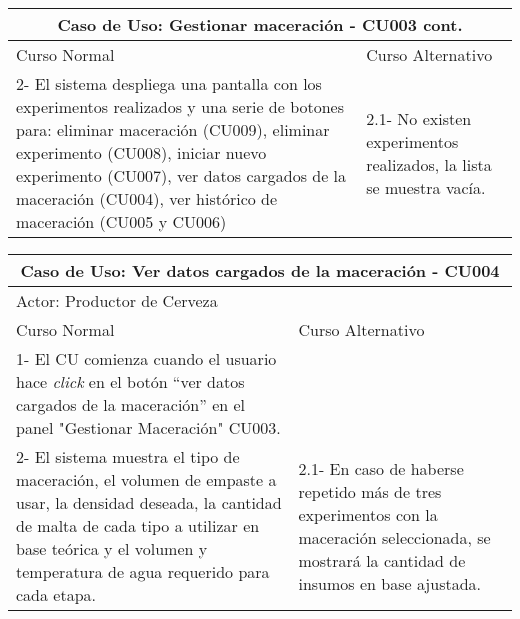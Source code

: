     \begin{minipage}{0.95\textwidth}
    \begin{center}
    \begin{tabularx}{\textwidth}{ | X | X |}
        \hline
        \multicolumn{2}{|c|}{\textbf{Caso de Uso: Gestionar maceración - CU003 cont.}} \\
        \hline
        Curso Normal & Curso Alternativo \\
        \hline    
        2- El sistema despliega una pantalla con los experimentos realizados y una serie de botones para: eliminar maceración (CU009), eliminar experimento (CU008), iniciar nuevo experimento (CU007), ver datos cargados de la maceración (CU004), ver histórico de maceración (CU005 y CU006) & 2.1- No existen experimentos realizados, la lista se muestra vacía.
        \\
        \hline
    \end{tabularx}
    \label{CU003b}
    \end{center}

    \begin{center}
    \begin{tabularx}{\textwidth}{ | X | X |}
        \hline
        \multicolumn{2}{|c|}{\textbf{Caso de Uso: Ver datos cargados de la maceración - CU004}} \\
        \hline
        \multicolumn{2}{|l|}{Actor: Productor de Cerveza} \\
        \hline
        Curso Normal & Curso Alternativo \\
        \hline
        1- El CU comienza cuando el usuario hace \textit{click} en el botón “ver datos cargados de la maceración” en el panel "Gestionar Maceración" CU003. & \\
        \hline
        2- El sistema muestra el tipo de maceración, el volumen de empaste a usar, la densidad deseada, la cantidad de malta de cada tipo a utilizar en base teórica y el volumen y temperatura de agua requerido para cada etapa. & 2.1- En caso de haberse repetido más de tres experimentos con la maceración seleccionada, se mostrará la cantidad de insumos en base ajustada. \\
        \hline
        
    \end{tabularx}
    \label{CU004}
    \end{center}
    \end{minipage}
    
